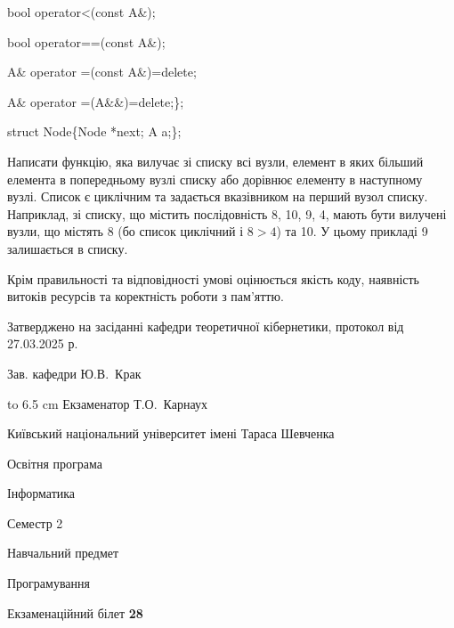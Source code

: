 \documentclass[12pt, ukrainian]{article}
\begin{document}
{\quad  bool operator<(const A\&); 

\quad  bool operator==(const A\&); 

\quad A\& operator =(const A\&)=delete; 

\quad  A\& operator =(A\&\&)=delete;\};

struct Node\{Node *next; A a;\};

 Написати функцію, яка вилучає зі списку всі вузли, елемент в яких більший елемента в попередньому вузлі списку або дорівнює елементу в наступному вузлі. Список є циклічним та задається вказівником на перший вузол списку. Наприклад, зі списку, що містить послідовність 8, 10, 9, 4, мають бути вилучені вузли, що містять 8 (бо список циклічний і $8>4$) та 10. У цьому прикладі 9 залишається в списку.

Крім правильності та відповідності умові оцінюється якість коду, наявність витоків ресурсів та коректність роботи з пам'яттю. 

}
{\smallskip\smallskip \begin {scriptsize} Затверджено на засіданні кафедри теоретичної кібернетики, протокол   від   27.03.2025 р.\par\smallskip\smallskip\smallskip\smallskip
{\parbox {6.5 cm} {Зав. кафедри \dotfill Ю.В.~Крак}}\hspace {0.7cm} {\hbox to 6.5 cm { Екзаменатор \dotfill Т.О.~Карнаух}} \end{scriptsize}}
\newpage
{{\begin {scriptsize}\par
{ \center  Київський національний університет імені Тараса Шевченка \par}
{\parbox {5 cm}{Освітня програма \hfill}{\parbox {7 cm}{Інформатика\hfill}}\parbox {6 cm}{\hfill Семестр 2}}\par
{\parbox {5 cm} {Навчальний предмет \hfill}\parbox {7 cm}{Програмування \hfill}\parbox {6cm}{\hfill}\par}\vspace{-15pt} \end{scriptsize}}{\center Екзаменаційний білет \No \textbf { 28 }\par}}
\end{document}
